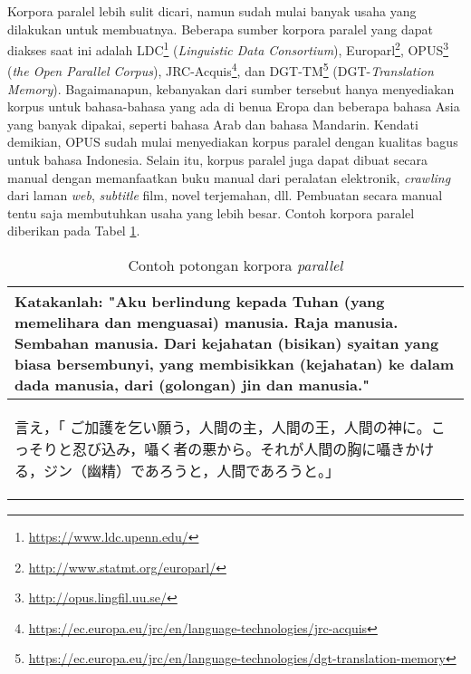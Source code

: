 \documentclass[../main/main.tex]{subfiles}
\begin{document}
Korpora paralel lebih sulit dicari, namun sudah mulai banyak usaha yang dilakukan untuk membuatnya. Beberapa sumber korpora paralel yang dapat diakses saat ini adalah LDC\footnote{\url{https://www.ldc.upenn.edu/}} (\textit{Linguistic Data Consortium}), Europarl\footnote{\url{http://www.statmt.org/europarl/}}, OPUS\footnote{\url{http://opus.lingfil.uu.se/}} (\textit{the Open Parallel Corpus}), JRC-Acquis\footnote{\url{https://ec.europa.eu/jrc/en/language-technologies/jrc-acquis}}, dan DGT-TM\footnote{\url{https://ec.europa.eu/jrc/en/language-technologies/dgt-translation-memory}} (DGT-\textit{Translation Memory}). Bagaimanapun, kebanyakan dari sumber tersebut hanya menyediakan korpus untuk bahasa-bahasa yang ada di benua Eropa dan beberapa bahasa Asia yang banyak dipakai, seperti bahasa Arab dan bahasa Mandarin. Kendati demikian, OPUS sudah mulai menyediakan korpus paralel dengan kualitas bagus untuk bahasa Indonesia. Selain itu, korpus paralel juga dapat dibuat secara manual dengan memanfaatkan buku manual dari peralatan elektronik, \textit{crawling} dari laman \textit{web}, \textit{subtitle} film, novel terjemahan, dll. Pembuatan secara manual tentu saja membutuhkan usaha yang lebih besar. Contoh korpora paralel diberikan pada Tabel \ref{tbl:studi_korpora_parallel}.

\begin{table}[htbp]
	\centering
	\caption{Contoh potongan korpora \textit{parallel} \parencite{tiedemann}}
	\label{tbl:studi_korpora_parallel}
	\begin{tabular}{|p{\tablewidth}|}
		\hline
		Katakanlah: "Aku berlindung kepada Tuhan (yang memelihara dan menguasai) manusia. Raja manusia. Sembahan manusia. Dari kejahatan (bisikan) syaitan yang biasa bersembunyi, yang membisikkan (kejahatan) ke dalam dada manusia, dari (golongan) jin dan manusia."\\ \hline
		\begin{CJK}{UTF8}{min}言え，「 ご加護を乞い願う，人間の主，人間の王，人間の神に。こっそりと忍び込み，囁く者の悪から。それが人間の胸に囁きかける，ジン（幽精）であろうと，人間であろうと。」
		\end{CJK}\\ \hline
	\end{tabular}
\end{table}
\end{document}
